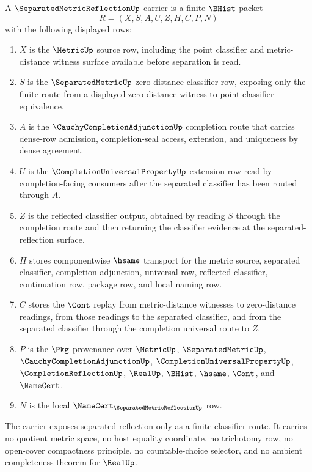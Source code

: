 \begin{definition}
\label{def:separated-metric-reflection-carrier}
A $\SeparatedMetricReflectionUp$ carrier is a finite $\BHist$ packet
$$
R=(X,S,A,U,Z,H,C,P,N)
$$
with the following displayed rows:
\begin{enumerate}
\item $X$ is the $\MetricUp$ source row, including the point classifier and metric-distance witness surface available before separation is read.
\item $S$ is the $\SeparatedMetricUp$ zero-distance classifier row, exposing only the finite route from a displayed zero-distance witness to point-classifier equivalence.
\item $A$ is the $\CauchyCompletionAdjunctionUp$ completion route that carries dense-row admission, completion-seal access, extension, and uniqueness by dense agreement.
\item $U$ is the $\CompletionUniversalPropertyUp$ extension row read by completion-facing consumers after the separated classifier has been routed through $A$.
\item $Z$ is the reflected classifier output, obtained by reading $S$ through the completion route and then returning the classifier evidence at the separated-reflection surface.
\item $H$ stores componentwise $\hsame$ transport for the metric source, separated classifier, completion adjunction, universal row, reflected classifier, continuation row, package row, and local naming row.
\item $C$ stores the $\Cont$ replay from metric-distance witnesses to zero-distance readings, from those readings to the separated classifier, and from the separated classifier through the completion universal route to $Z$.
\item $P$ is the $\Pkg$ provenance over $\MetricUp$, $\SeparatedMetricUp$, $\CauchyCompletionAdjunctionUp$, $\CompletionUniversalPropertyUp$, $\CompletionReflectionUp$, $\RealUp$, $\BHist$, $\hsame$, $\Cont$, and $\NameCert$.
\item $N$ is the local $\NameCert_{\SeparatedMetricReflectionUp}$ row.
\end{enumerate}
The carrier exposes separated reflection only as a finite classifier route. It carries no quotient metric space, no host equality coordinate, no trichotomy row, no open-cover compactness principle, no countable-choice selector, and no ambient completeness theorem for $\RealUp$.
\end{definition}

